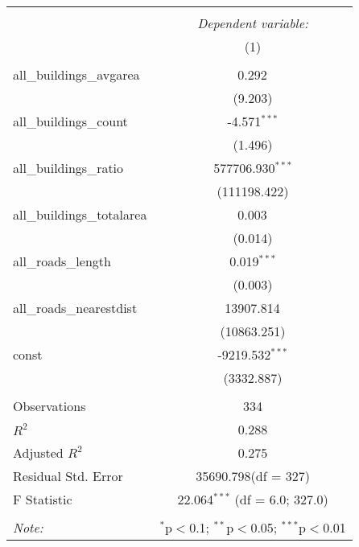 \begin{table}[!htbp] \centering
\begin{tabular}{@{\extracolsep{5pt}}lc}
\\[-1.8ex]\hline
\hline \\[-1.8ex]
& \multicolumn{1}{c}{\textit{Dependent variable:}} \
\cr \cline{1-2}
\\[-1.8ex] & (1) \\
\hline \\[-1.8ex]
 all_buildings_avgarea & 0.292$^{}$ \\
  & (9.203) \\
 all_buildings_count & -4.571$^{***}$ \\
  & (1.496) \\
 all_buildings_ratio & 577706.930$^{***}$ \\
  & (111198.422) \\
 all_buildings_totalarea & 0.003$^{}$ \\
  & (0.014) \\
 all_roads_length & 0.019$^{***}$ \\
  & (0.003) \\
 all_roads_nearestdist & 13907.814$^{}$ \\
  & (10863.251) \\
 const & -9219.532$^{***}$ \\
  & (3332.887) \\
\hline \\[-1.8ex]
 Observations & 334 \\
 $R^2$ & 0.288 \\
 Adjusted $R^2$ & 0.275 \\
 Residual Std. Error & 35690.798(df = 327)  \\
 F Statistic & 22.064$^{***}$ (df = 6.0; 327.0) \\
\hline
\hline \\[-1.8ex]
\textit{Note:} & \multicolumn{1}{r}{$^{*}$p$<$0.1; $^{**}$p$<$0.05; $^{***}$p$<$0.01} \\
\end{tabular}
\end{table}